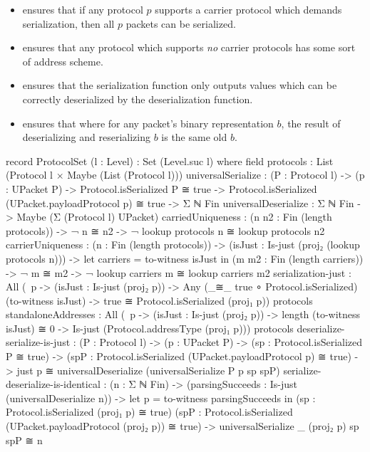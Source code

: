 \documentclass{report}
\begin{document}
\begin{itemize}
  \item {}  ensures that if any protocol \(p\) supports a carrier protocol which demands serialization, then all \(p\) packets can be serialized.
  \item {}  ensures that any protocol which supports \emph{no} carrier protocols has some sort of address scheme.
  \item {}  ensures that the serialization function only outputs values which can be correctly deserialized by the deserialization function.
  \item {}  ensures that where for any packet's binary representation \(b\), the result of deserializing and reserializing \(b\) is the same old \(b\).
\end{itemize}

\begin{code}
  record ProtocolSet (l : Level) : Set (Level.suc l) where
    field
      protocols : List (Protocol l × Maybe (List (Protocol l)))
      universalSerialize :
        (P : Protocol l) ->
        (p : UPacket P) ->
        Protocol.isSerialized P ≅ true ->
        Protocol.isSerialized (UPacket.payloadProtocol p) ≅ true ->
        Σ ℕ Fin
      universalDeserialize : Σ ℕ Fin -> Maybe (Σ (Protocol l) UPacket)
      carriedUniqueness :
        (n n2 : Fin (length protocols)) ->
        ¬ n ≅ n2 ->
        ¬ lookup protocols n ≅ lookup protocols n2
      carrierUniqueness :
        (n : Fin (length protocols)) ->
        (isJust : Is-just (proj₂ (lookup protocols n))) ->
        let carriers = to-witness isJust in
        (m m2 : Fin (length carriers)) ->
        ¬ m ≅ m2 ->
        ¬ lookup carriers m ≅ lookup carriers m2
      serialization-just :
        All (\ p -> (isJust : Is-just (proj₂ p))
                 -> Any (_≅_ true ∘ Protocol.isSerialized)
                        (to-witness isJust)
                 -> true ≅ Protocol.isSerialized (proj₁ p))
            protocols
      standaloneAddresses :
        All (\ p -> (isJust : Is-just (proj₂ p))
                 -> length (to-witness isJust) ≅ 0
                 -> Is-just (Protocol.addressType (proj₁ p)))
            protocols
      deserialize-serialize-is-just :
        (P : Protocol l) ->
        (p : UPacket P) ->
        (sp : Protocol.isSerialized P ≅ true) ->
        (spP : Protocol.isSerialized (UPacket.payloadProtocol p) ≅ true) ->
        just p ≅
        universalDeserialize (universalSerialize P p sp spP)
      serialize-deserialize-is-identical :
        (n : Σ ℕ Fin) ->
        (parsingSucceeds : Is-just (universalDeserialize n)) ->
        let p = to-witness parsingSucceeds in
        (sp : Protocol.isSerialized (proj₁ p) ≅ true)
        (spP : Protocol.isSerialized (UPacket.payloadProtocol (proj₂ p)) ≅ true) ->
        universalSerialize _ (proj₂ p) sp spP ≅ n
\end{code}
\end{document}
